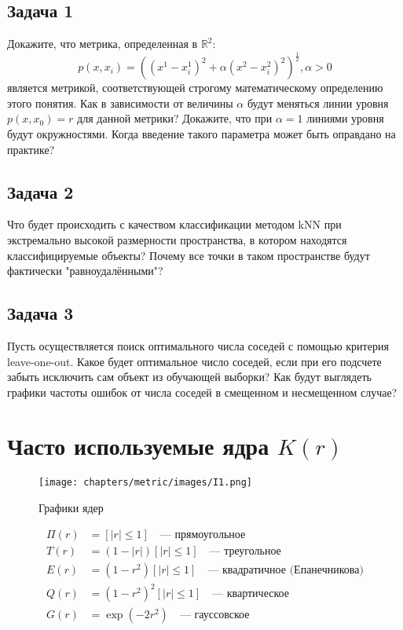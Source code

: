 \subsection{Задача 1}
Докажите, что метрика, определенная в $\mathbb{R}^2$:
\begin{equation}
    p(x, x_i) = \left( (x^1 - x^1_i)^2 + \alpha (x^2 - x^2_i)^2 \right)^\frac{1}{2}, \alpha > 0 
\end{equation}
является метрикой, соответствующей строгому математическому определению этого понятия.
Как в зависимости от величины $\alpha$ будут меняться линии уровня $p(x, x_0) = r$ для данной метрики? 
Докажите, что при $\alpha = 1$ линиями уровня будут окружностями.
Когда введение такого параметра может быть оправдано на практике?

\subsection{Задача 2}
Что будет происходить с качеством классификации методом kNN при экстремально высокой размерности пространства, в котором находятся классифицируемые объекты? Почему все точки в таком пространстве будут фактически "равноудалёнными"?

\subsection{Задача 3}
Пусть осуществляется поиск оптимального числа соседей с помощью критерия leave-one-out. Какое будет оптимальное число соседей, если при его подсчете забыть исключить сам объект из обучающей выборки? Как будут выглядеть графики частоты ошибок от числа соседей в смещенном и несмещенном случае? 

\section*{Часто используемые ядра \(K(r)\)}

\begin{figure}[h]
    \centering
    \texttt{[image: chapters/metric/images/I1.png]}
    \caption{Графики ядер}
    \label{fig:kernels}
\end{figure}

\begin{align*}
\Pi(r) &= [{\lvert r \rvert \leq 1}] \quad \text{— прямоугольное} \\
T(r) &= (1 - \lvert r \rvert) [{\lvert r \rvert \leq 1}] \quad \text{— треугольное} \\
E(r) &= (1 - r^2) [{\lvert r \rvert \leq 1}] \quad \text{— квадратичное (Епанечникова)} \\
Q(r) &= (1 - r^2)^2 [{\lvert r \rvert \leq 1}] \quad \text{— квартическое} \\
G(r) &= \exp(-2r^2) \quad \text{— гауссовское}
\end{align*}


